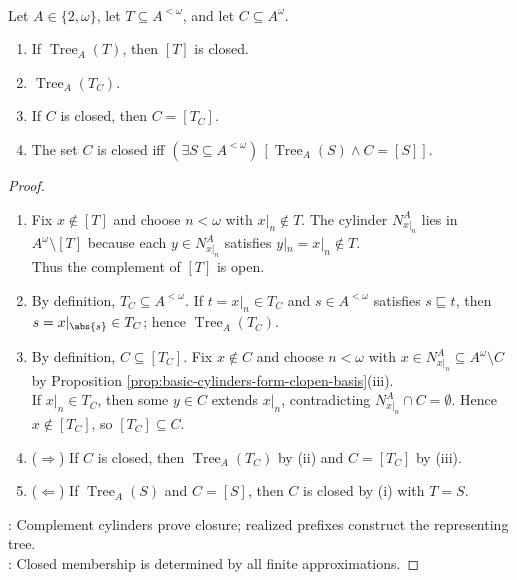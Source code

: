 \begin{theorem} \label{thm:closed-sets-are-tree-bodies} \\
Let $A\in\{2,\omega\}$, let $T\subseteq A^{<\omega}$, and let $C\subseteq A^\omega$.
\begin{enumerate}[label=(\roman*)]
\setlength{\itemsep}{0pt}
\item If $\operatorname{Tree}_A(T)$, then $[T]$ is closed.
\item $\operatorname{Tree}_A(T_C)$.
\item If $C$ is closed, then $C=[T_C]$.
\item The set $C$ is closed iff $(\exists S\subseteq A^{<\omega})\,[\operatorname{Tree}_A(S)\land C=[S]]$.
\end{enumerate}
\begin{proof}
\begin{enumerate}[label=(\roman*)]
\setlength{\itemsep}{0pt}
\item[$(i)$] Fix $x\notin[T]$ and choose $n<\omega$ with $x|_n\notin T$. The cylinder $N_{x|_n}^A$ lies in $A^\omega\setminus[T]$ because each $y\in N_{x|_n}^A$ satisfies $y|_n=x|_n\notin T$.\\
Thus the complement of $[T]$ is open.
\item[$(ii)$] By definition, $T_C\subseteq A^{<\omega}$. If $t=x|_n\in T_C$ and $s\in A^{<\omega}$ satisfies $s\sqsubseteq t$, then $s=x|_{\abs{s}}\in T_C$; hence $\operatorname{Tree}_A(T_C)$.
\item[$(iii)$] By definition, $C\subseteq[T_C]$. Fix $x\notin C$ and choose $n<\omega$ with $x\in N_{x|_n}^A\subseteq A^\omega\setminus C$ by Proposition \ref{prop:basic-cylinders-form-clopen-basis}(iii).\\
If $x|_n\in T_C$, then some $y\in C$ extends $x|_n$, contradicting $N_{x|_n}^A\cap C=\emptyset$. Hence $x\notin[T_C]$, so $[T_C]\subseteq C$.
\item[$(iv)$] ($\Rightarrow$) If $C$ is closed, then $\operatorname{Tree}_A(T_C)$ by (ii) and $C=[T_C]$ by (iii).
\item[$(iv)$] ($\Leftarrow$) If $\operatorname{Tree}_A(S)$ and $C=[S]$, then $C$ is closed by (i) with $T=S$.
\end{enumerate}
: Complement cylinders prove closure; realized prefixes construct the representing tree.\\
: Closed membership is determined by all finite approximations.
\end{proof}
\end{theorem}
